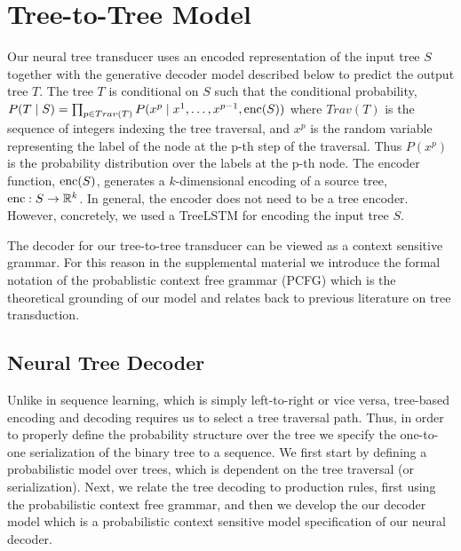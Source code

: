 \documentclass{article}
\newcommand{\jcs}[1]{\noindent{\textcolor{green}{\{{\bf jcs:} {\em #1}\}}}}
\begin{document}
\section{Tree-to-Tree Model}

Our neural tree transducer uses an encoded representation of the input tree $S$ together with the generative decoder model described below to predict the output tree $T$. 
The tree $T$ is conditional on $S$ such that the conditional probability, $P(T \mid S) = \prod_{p \in Trav(T)}{P(x^p \mid x^{1}, \ldots, x^{p-1},\hbox{enc}(S))}$ where $Trav(T)$ is the sequence of integers indexing the tree traversal, and $x^p$ is the random variable representing the label of the node at the p-th step of the traversal. Thus $P(x^p)$ is the probability distribution over the labels at the p-th node. The encoder function, $\hbox{enc}(S)$, generates a $k$-dimensional encoding of a source tree, $\hbox{enc}: S \to \mathbb{R}^k$. In general, the encoder does not need to be a tree encoder. However, concretely, we used a TreeLSTM for encoding the input tree $S$.

The decoder for our tree-to-tree transducer can be viewed as a context sensitive grammar. For this reason in the supplemental material we introduce the formal notation of the probablistic context free grammar (PCFG) which is the theoretical grounding of our model and relates back to previous literature on tree transduction. 



\subsection{Neural Tree Decoder}

Unlike in sequence learning, which is simply left-to-right or vice versa, tree-based encoding and decoding requires us to select a tree traversal path.  Thus, in order to properly define the probability structure over the tree we specify the one-to-one serialization of the binary tree to a sequence.
We first start by defining a probabilistic model over trees, which is dependent on the tree traversal (or serialization). Next, we relate the tree decoding to production rules, first using the probabilistic context free grammar, and then we develop the our decoder model which is a probabilistic context sensitive model specification of our neural decoder. 
\end{document}
